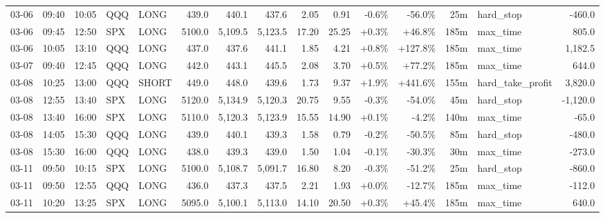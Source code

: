 \documentclass[11pt,a4paper,twoside]{article}
\begin{document}
\begin{landscape}
\begin{center}
\begin{longtable}{>{\color{txtmain}}l l l l l r r r r r r r r >{\color{txtmain}}l r}
03-06 & 09:40 & 10:05 & QQQ & LONG & 439.0 & 440.1 & 437.6 & 2.05 & 0.91 & \textcolor{lossred}{-0.6\%} & \textcolor{lossred}{-56.0\%} & 25m & hard\_stop & \textcolor{lossred}{-460.0} \\
03-06 & 09:45 & 12:50 & SPX & LONG & 5100.0 & 5,109.5 & 5,123.5 & 17.20 & 25.25 & \textcolor{wingreen}{+0.3\%} & \textcolor{wingreen}{+46.8\%} & 185m & max\_time & \textcolor{wingreen}{805.0} \\
03-06 & 10:05 & 13:10 & QQQ & LONG & 437.0 & 437.6 & 441.1 & 1.85 & 4.21 & \textcolor{wingreen}{+0.8\%} & \textcolor{wingreen}{+127.8\%} & 185m & max\_time & \textcolor{wingreen}{1,182.5} \\
03-07 & 09:40 & 12:45 & QQQ & LONG & 442.0 & 443.1 & 445.5 & 2.08 & 3.70 & \textcolor{wingreen}{+0.5\%} & \textcolor{wingreen}{+77.2\%} & 185m & max\_time & \textcolor{wingreen}{644.0} \\
03-08 & 10:25 & 13:00 & QQQ & SHORT & 449.0 & 448.0 & 439.6 & 1.73 & 9.37 & \textcolor{wingreen}{+1.9\%} & \textcolor{wingreen}{+441.6\%} & 155m & hard\_take\_profit & \textcolor{wingreen}{3,820.0} \\
03-08 & 12:55 & 13:40 & SPX & LONG & 5120.0 & 5,134.9 & 5,120.3 & 20.75 & 9.55 & \textcolor{lossred}{-0.3\%} & \textcolor{lossred}{-54.0\%} & 45m & hard\_stop & \textcolor{lossred}{-1,120.0} \\
03-08 & 13:40 & 16:00 & SPX & LONG & 5110.0 & 5,120.3 & 5,123.9 & 15.55 & 14.90 & \textcolor{wingreen}{+0.1\%} & \textcolor{lossred}{-4.2\%} & 140m & max\_time & \textcolor{lossred}{-65.0} \\
03-08 & 14:05 & 15:30 & QQQ & LONG & 439.0 & 440.1 & 439.3 & 1.58 & 0.79 & \textcolor{lossred}{-0.2\%} & \textcolor{lossred}{-50.5\%} & 85m & hard\_stop & \textcolor{lossred}{-480.0} \\
03-08 & 15:30 & 16:00 & QQQ & LONG & 438.0 & 439.3 & 439.0 & 1.50 & 1.04 & \textcolor{lossred}{-0.1\%} & \textcolor{lossred}{-30.3\%} & 30m & max\_time & \textcolor{lossred}{-273.0} \\
03-11 & 09:50 & 10:15 & SPX & LONG & 5100.0 & 5,108.7 & 5,091.7 & 16.80 & 8.20 & \textcolor{lossred}{-0.3\%} & \textcolor{lossred}{-51.2\%} & 25m & hard\_stop & \textcolor{lossred}{-860.0} \\
03-11 & 09:50 & 12:55 & QQQ & LONG & 436.0 & 437.3 & 437.5 & 2.21 & 1.93 & \textcolor{wingreen}{+0.0\%} & \textcolor{lossred}{-12.7\%} & 185m & max\_time & \textcolor{lossred}{-112.0} \\
03-11 & 10:20 & 13:25 & SPX & LONG & 5095.0 & 5,100.1 & 5,113.0 & 14.10 & 20.50 & \textcolor{wingreen}{+0.3\%} & \textcolor{wingreen}{+45.4\%} & 185m & max\_time & \textcolor{wingreen}{640.0} \\

\end{longtable}
\end{center}
\end{landscape}
\end{document}
